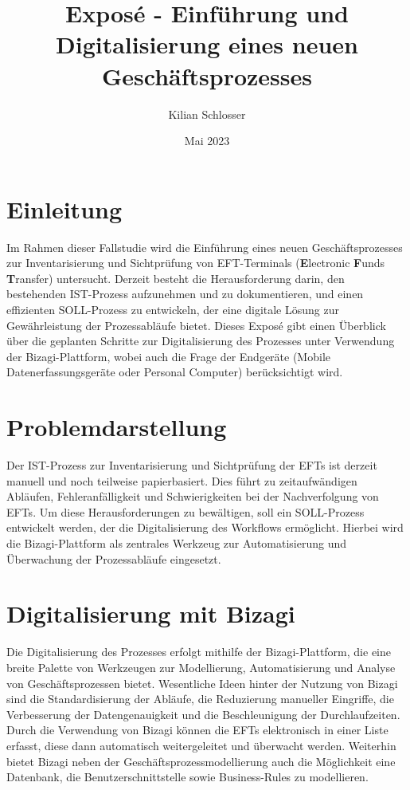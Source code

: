 \documentclass[12pt, a4paper]{article}
\title{Exposé - Einführung und Digitalisierung eines neuen Geschäftsprozesses}
\author{Kilian Schlosser}
\date{Mai 2023}
\begin{document}
\maketitle
\section{Einleitung}

Im Rahmen dieser Fallstudie wird die Einführung eines neuen Geschäftsprozesses zur Inventarisierung und Sichtprüfung von EFT-Terminals (\textbf{E}lectronic \textbf{F}unds \textbf{T}ransfer) untersucht. 
Derzeit besteht die Herausforderung darin, den bestehenden IST-Prozess aufzunehmen und zu dokumentieren, und einen effizienten SOLL-Prozess zu entwickeln, der eine digitale Lösung zur 
Gewährleistung der Prozessabläufe bietet. Dieses Exposé gibt einen Überblick über die geplanten Schritte zur Digitalisierung des Prozesses unter Verwendung der Bizagi-Plattform,
wobei auch die Frage der Endgeräte (Mobile Datenerfassungsgeräte oder Personal Computer) berücksichtigt wird.

\section{Problemdarstellung}

Der IST-Prozess zur Inventarisierung und Sichtprüfung der EFTs ist derzeit manuell und noch teilweise papierbasiert. Dies führt zu zeitaufwändigen Abläufen, Fehleranfälligkeit und Schwierigkeiten bei der 
Nachverfolgung von EFTs. Um diese Herausforderungen zu bewältigen, soll ein SOLL-Prozess entwickelt werden, der die Digitalisierung des Workflows ermöglicht. Hierbei wird die Bizagi-Plattform als zentrales 
Werkzeug zur Automatisierung und Überwachung der Prozessabläufe eingesetzt.

\section{Digitalisierung mit Bizagi}

Die Digitalisierung des Prozesses erfolgt mithilfe der Bizagi-Plattform, die eine breite Palette von Werkzeugen zur Modellierung, Automatisierung und Analyse von Geschäftsprozessen bietet. 
Wesentliche Ideen hinter der Nutzung von Bizagi sind die Standardisierung der Abläufe, die Reduzierung manueller Eingriffe, die Verbesserung der Datengenauigkeit und die Beschleunigung der Durchlaufzeiten. 
Durch die Verwendung von Bizagi können die EFTs elektronisch in einer Liste erfasst, diese dann automatisch weitergeleitet und überwacht werden.
Weiterhin bietet Bizagi neben der Geschäftsprozessmodellierung auch die Möglichkeit eine Datenbank, die Benutzerschnittstelle sowie Business-Rules zu modellieren.
\end{document}
